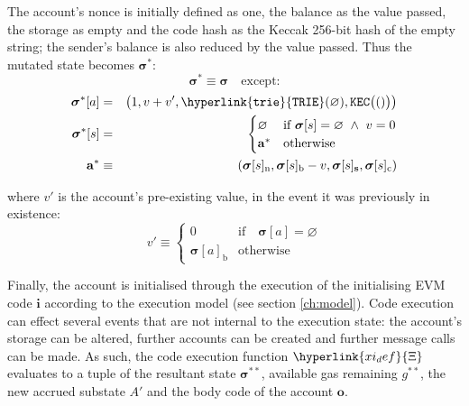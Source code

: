 \documentclass[9pt,oneside]{amsart}
\begin{document}
\begin{multicols}{2}
The account's nonce is initially defined as one, the balance as the value passed, the storage as empty and the code hash as the Keccak 256-bit hash of the empty string; the sender's balance is also reduced by the value passed. Thus the mutated state becomes $\boldsymbol{\sigma}^*$:
\begin{equation}
\boldsymbol{\sigma}^* \equiv \boldsymbol{\sigma} \quad \text{except:}
\end{equation}
\begin{eqnarray}
\boldsymbol{\sigma}^*[a] &=& \big( 1, v + v', \mathtt{\hyperlink{trie}{TRIE}}(\varnothing), \mathtt{KEC}\big(()\big) \big) \\
\boldsymbol{\sigma}^*[s] &=& \begin{cases}
\varnothing & \text{if}\ \boldsymbol{\sigma}[s] = \varnothing \ \wedge\ v = 0 \\
\mathbf{a}^* & \text{otherwise}
\end{cases} \\
\mathbf{a}^* &\equiv& (\boldsymbol{\sigma}[s]_{\mathrm{n}}, \boldsymbol{\sigma}[s]_{\mathrm{b}} - v, \boldsymbol{\sigma}[s]_{\mathbf{s}}, \boldsymbol{\sigma}[s]_{\mathrm{c}})
\end{eqnarray}

where $v'$ is the account's pre-existing value, in the event it was previously in existence:
\begin{equation}
v' \equiv \begin{cases}
0 & \text{if} \quad \boldsymbol{\sigma}[a] = \varnothing\\
\boldsymbol{\sigma}[a]_{\mathrm{b}} & \text{otherwise}
\end{cases}
\end{equation}


Finally, the account is initialised through the execution of the initialising EVM code $\mathbf{i}$ according to the execution model (see section \ref{ch:model}).
Code execution can effect several events that are not internal to the execution state: the account's storage can be altered, further accounts can be created and further message calls can be made.
As such, the code execution function $\hyperlink{xi_def}{\Xi}$ evaluates to a tuple of the resultant state $\boldsymbol{\sigma}^{**}$, available gas remaining $g^{**}$, the new accrued substate $A'$ and the body code of the account $\mathbf{o}$.


\end{multicols}
\end{document}
